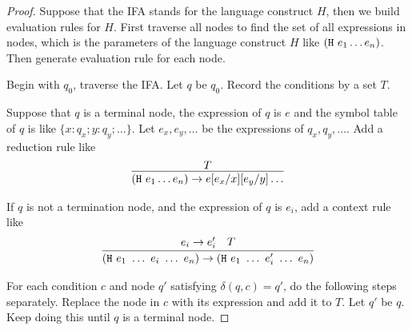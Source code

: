 \begin{proof}

    Suppose that the IFA stands for the language construct $H$, then we build evaluation rules for $H$. First traverse all nodes to find the set of all expressions in nodes, which is the parameters of the language construct $H$ like $(\mbox{\tt H}~e_1 \ldots e_n)$. Then generate evaluation rule for each node.

    Begin with $q_0$, traverse the IFA. Let $q$ be $q_0$. Record the conditions by a set $T$.

    Suppose that $q$ is a terminal node, the expression of $q$ is $e$ and the symbol table of $q$ is like $\{x:q_x; y:q_y; \ldots\}$. Let $e_x,e_y,\ldots$ be the expressions of $q_x, q_y, \ldots$. Add a reduction rule like
    \[
        \infer{(\m{H}~e_1 \ldots e_n) \to e[e_x/x][e_y/y]\ldots}{T}
    \]

    If $q$ is not a termination node, and the expression of $q$ is $e_i$, add a context rule like
    \[
        \infer{(\m{H}~e_1~\ldots~e_i~\ldots~e_n) \to (\m{H}~e_1~\ldots~e_i'~\ldots~e_n)}{e_i \to e_i' \quad T}
    \]


    For each condition $c$ and node $q'$ satisfying $\delta(q, c)=q'$, do the following steps separately. Replace the node in $c$ with its expression and add it to $T$. Let $q'$ be $q$. Keep doing this until $q$ is a terminal node.
\end{proof}

